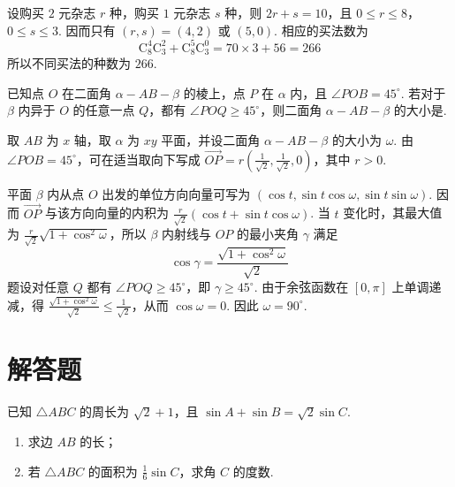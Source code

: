 \begin{solution}
设购买 \(2\) 元杂志 \(r\) 种，购买 \(1\) 元杂志 \(s\) 种，则 \(2r+s=10\)，且 \(0\leqslant r\leqslant8\)，\(0\leqslant s\leqslant3\). 因而只有 \((r,s)=(4,2)\) 或 \((5,0)\). 相应的买法数为
\[
\mathrm C_8^4\mathrm C_3^2+\mathrm C_8^5\mathrm C_3^0=70\times3+56=266
\]
所以不同买法的种数为 \(266\).
\end{solution}

\begin{problem}
已知点 \(O\) 在二面角 \( \alpha - AB - \beta \) 的棱上，点 \(P\) 在 \( \alpha \) 内，且 \(\angle POB = 45^{\circ}\). 若对于 \( \beta \) 内异于 \(O\) 的任意一点 \(Q\)，都有 \(\angle POQ \geqslant 45^{\circ}\)，则二面角 \( \alpha - AB - \beta \) 的大小是\fillinblank{}.
\end{problem}

\begin{solution}
取 \(AB\) 为 \(x\) 轴，取 \(\alpha\) 为 \(xy\) 平面，并设二面角 \(\alpha-AB-\beta\) 的大小为 \(\omega\). 由 \(\angle POB=45^{\circ}\)，可在适当取向下写成 \(\overrightarrow{OP}=r\left(\frac{1}{\sqrt2},\frac{1}{\sqrt2},0\right)\)，其中 \(r>0\).

平面 \(\beta\) 内从点 \(O\) 出发的单位方向向量可写为 \(\left(\cos t,\sin t\cos\omega,\sin t\sin\omega\right)\). 因而 \(\overrightarrow{OP}\) 与该方向向量的内积为 \(\frac{r}{\sqrt2}(\cos t+\sin t\cos\omega)\). 当 \(t\) 变化时，其最大值为 \(\frac{r}{\sqrt2}\sqrt{1+\cos^2\omega}\)，所以 \(\beta\) 内射线与 \(OP\) 的最小夹角 \(\gamma\) 满足
\[
\cos\gamma=\frac{\sqrt{1+\cos^2\omega}}{\sqrt2}
\]
题设对任意 \(Q\) 都有 \(\angle POQ\geqslant45^{\circ}\)，即 \(\gamma\geqslant45^{\circ}\). 由于余弦函数在 \([0,\pi]\) 上单调递减，得 \(\frac{\sqrt{1+\cos^2\omega}}{\sqrt2}\leqslant\frac{1}{\sqrt2}\)，从而 \(\cos\omega=0\). 因此 \(\omega=90^{\circ}\).
\end{solution}

\section{解答题}

\begin{problem}
已知 \(\triangle ABC\) 的周长为 \(\sqrt{2} + 1\)，且 \(\sin A + \sin B = \sqrt{2} \sin C\).

\begin{enumerate}
\item 求边 \(AB\) 的长；
\item 若 \(\triangle ABC\) 的面积为 \(\frac{1}{6} \sin C\)，求角 \(C\) 的度数.
\end{enumerate}
\end{problem}

